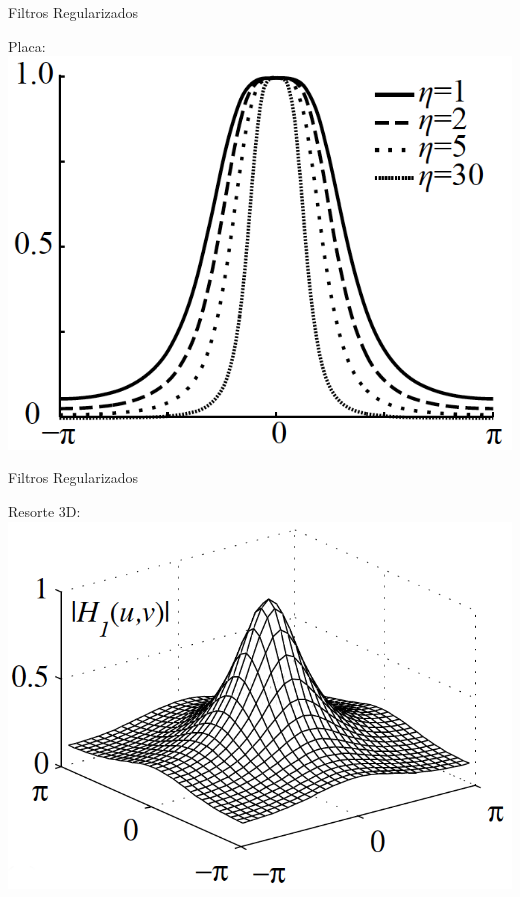 \documentclass[]{beamer}
\begin{document}
\begin{frame}{Filtros Regularizados}
\begin{center}

Placa:\\
\includegraphics[scale=0.6]{Images/FrecuenciaPlaca.png}

\end{center}
\end{frame}
\begin{frame}{Filtros Regularizados}
\begin{center}

Resorte 3D:\\
\includegraphics[scale=0.6]{Images/FrecuenciaResorte3D.png}

\end{center}
\end{frame}
\end{document}
